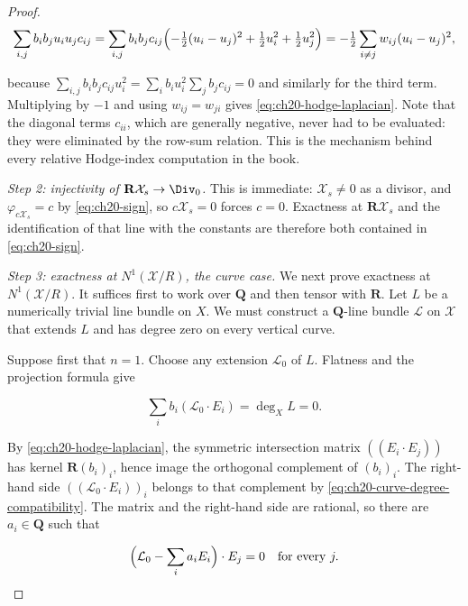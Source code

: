 \begin{proof}
\[
 \sum_{i,j}b_ib_ju_iu_jc_{ij}
 =\sum_{i,j}b_ib_jc_{ij}\Bigl(
   -\tfrac12(u_i-u_j)^2+\tfrac12u_i^2+\tfrac12u_j^2\Bigr)
 =-\tfrac12\sum_{i\ne j}w_{ij}(u_i-u_j)^2 ,
\]

because \(\sum_{i,j}b_ib_jc_{ij}u_i^2=\sum_ib_iu_i^2\sum_jb_jc_{ij}=0\) and
similarly for the third term.  Multiplying by \(-1\) and using
\(w_{ij}=w_{ji}\) gives \eqref{eq:ch20-hodge-laplacian}.  Note that the
diagonal terms \(c_{ii}\), which are generally negative, never had to be
evaluated: they were eliminated by the row-sum relation.  This is the
mechanism behind every relative Hodge-index computation in the book.

\emph{Step 2: injectivity of \(\mathbf R\mathcal X_s\to\Div_0\).}
This is immediate: \(\mathcal X_s\neq0\) as a divisor, and
\(\varphi_{c\mathcal X_s}=c\) by \eqref{eq:ch20-sign}, so
\(c\mathcal X_s=0\) forces \(c=0\).  Exactness at
\(\mathbf R\mathcal X_s\) and the identification of that line with the
constants are therefore both contained in \eqref{eq:ch20-sign}.

\emph{Step 3: exactness at \(N^1(\mathcal X/R)\), the curve case.}
We next prove exactness at \(N^1(\mathcal X/R)\).  It suffices first to work
over \(\mathbf Q\) and then tensor with \(\mathbf R\).  Let \(L\) be a
numerically trivial line bundle on \(X\).  We must construct a
\(\mathbf Q\)-line bundle \(\mathcal L\) on \(\mathcal X\) that extends
\(L\) and has degree zero on every vertical curve.

Suppose first that \(n=1\).  Choose any extension \(\mathcal L_0\) of
\(L\).  Flatness and the projection formula give

\begin{equation}
\label{eq:ch20-curve-degree-compatibility}
          \sum_i b_i(\mathcal L_0\cdot E_i)=\deg_X L=0.
\end{equation}

By \eqref{eq:ch20-hodge-laplacian}, the symmetric intersection matrix
\(((E_i\cdot E_j))\) has kernel \(\mathbf R(b_i)_i\), hence image the
orthogonal complement of \((b_i)_i\).  The right-hand side
\(((\mathcal L_0\cdot E_i))_i\) belongs to that complement by
\eqref{eq:ch20-curve-degree-compatibility}.  The matrix and the right-hand
side are rational, so there are \(a_i\in\mathbf Q\) such that

\begin{equation}
\label{eq:ch20-curve-vertical-correction}
          \Bigl(\mathcal L_0-\sum_i a_iE_i\Bigr)\cdot E_j=0
          \quad\text{for every }j.
\end{equation}


\end{proof}
